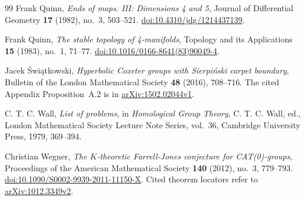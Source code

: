 \begin{thebibliography}{99}
Frank Quinn,
\emph{Ends of maps. III: Dimensions 4 and 5},
Journal of Differential Geometry \textbf{17} (1982), no.~3, 503--521.
\href{https://doi.org/10.4310/jdg/1214437139}{doi:10.4310/jdg/1214437139}.

Frank Quinn,
\emph{The stable topology of 4-manifolds},
Topology and its Applications \textbf{15} (1983), no.~1, 71--77.
\href{https://doi.org/10.1016/0166-8641(83)90049-4}{doi:10.1016/0166-8641(83)90049-4}.

Jacek \'Swi{\k a}tkowski,
\emph{Hyperbolic Coxeter groups with Sierpi\'nski carpet boundary},
Bulletin of the London Mathematical Society \textbf{48} (2016), 708--716.
The cited Appendix Proposition~A.2 is in
\href{https://arxiv.org/abs/1502.02044v1}{arXiv:1502.02044v1}.

C. T. C. Wall,
\emph{List of problems},
in \emph{Homological Group Theory}, C. T. C. Wall, ed.,
London Mathematical Society Lecture Note Series, vol.~36,
Cambridge University Press, 1979, 369--394.

Christian Wegner,
\emph{The $K$-theoretic Farrell-Jones conjecture for CAT(0)-groups},
Proceedings of the American Mathematical Society \textbf{140} (2012),
no.~3, 779--793.
\href{https://doi.org/10.1090/S0002-9939-2011-11150-X}{doi:10.1090/S0002-9939-2011-11150-X}.
Cited theorem locators refer to
\href{https://arxiv.org/abs/1012.3349v2}{arXiv:1012.3349v2}.

\end{thebibliography}
